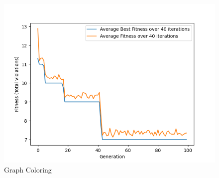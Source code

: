 \documentclass[11pt, letterpaper]{article}
\begin{document}
\begin{figure}[H]
  \includegraphics[width=\linewidth]{images/graphcoloring_tr_rb.png}
  \caption{Graph Coloring}
\endminipage
\end{figure}
\end{document}
